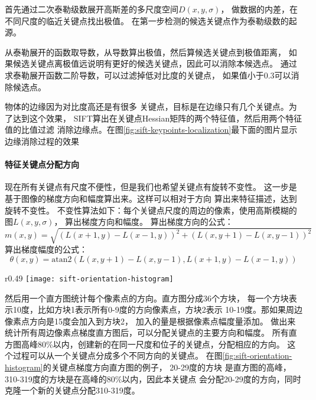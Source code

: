 首先通过二次泰勒级数展开高斯差的多尺度空间$D \left( x, y, \sigma \right)$，
做数据的内差，在不同尺度的临近关键点找出极值。
在第一步检测的候选关键点作为泰勒级数的起源。

从泰勒展开的函数取导数，从导数算出极值，然后算候选关键点到极值距离，
如果候选关键点离极值远说明有更好的候选关键点，因此可以消除本候选点。
通过求泰勒展开函数二阶导数，可以过滤掉低对比度的关键点，
如果值小于0.3可以消除候选点。

物体的边缘因为对比度高还是有很多
关键点，目标是在边缘只有几个关键点。为了达到这个效果，
SIFT算出在关键点Hessian矩阵的两个特征值，然后用两个特征值的比值过滤
消除边缘点。在图\ref{fig:sift-keypoints-localization}最下面的图片显示
边缘消除过程的效果

\paragraph*{特征关键点分配方向}
现在所有关键点有尺度不便性，但是我们也希望关键点有旋转不变性。
这一步是基于图像的梯度方向和幅度算出来。这样可以相对于方向
算出来特征描述，达到旋转不变性。
不变性算法如下：每个关键点尺度的周边的像素，使用高斯模糊的图$L \left( x, y, \sigma \right)$，
算出梯度方向和幅度。
算出梯度方向的公式：$$m \left( x, y \right) = \sqrt{\left( L \left( x+1, y \right) - L \left( x-1, y \right) \right)^2 
                  + \left( L \left( x, y+1 \right) - L \left( x, y-1 \right) \right)^2}$$
算出梯度幅度的公式：$$\theta \left( x, y \right) = \mathrm{atan2}\left(L \left( x, y+1 \right) - L \left( x, y-1 \right),
               L \left( x+1, y \right) - L \left( x-1, y \right) \right)$$
\begin{wrapfigure}{r}{0.49\textwidth}
  \centering
    \texttt{[image: sift-orientation-histogram]}
    \caption{SIFT关键点梯度直方图例子。 \\
             图片源：\cite{aishack:sift-orientation}}
  \label{fig:sift-orientation-histogram}
\end{wrapfigure}
然后用一个直方图统计每个像素点的方向。直方图分成36个方块，
每一个方块表示10度，比如方块1表示所有0-9度的方向像素点，方块2表示
10-19度。那如果周边像素点方向是15度会加入到方块2，
加入的量是根据像素点幅度量添加。
做出来统计所有周边像素点梯度直方图后，可以分配关键点的主要方向和幅度。
所有直方图高峰80\%以内，创建新的在同一尺度和位子的关键点，分配相应的方向。
这个过程可以从一个关键点分成多个不同方向的关键点。
在图\ref{fig:sift-orientation-histogram}的关键点梯度方向直方图的例子，
20-29度的方块 是直方图的高峰，310-319度的方块是在高峰的80\%以内，因此本关键点
会分配20-29度的方向，同时克隆一个新的关键点分配310-319度。

